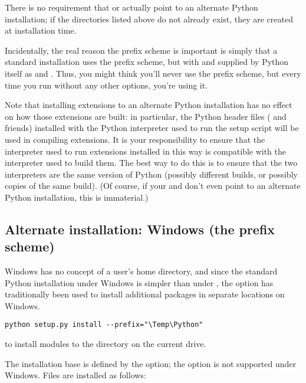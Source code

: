 \documentclass{howto}
\begin{document}
There is no requirement that  or
 actually point to an alternate Python
installation; if the directories listed above do not already exist, they
are created at installation time.

Incidentally, the real reason the prefix scheme is important is simply
that a standard \UNIX{} installation uses the prefix scheme, but with
 and  supplied by
Python itself as  and .  Thus,
you might think you'll never use the prefix scheme, but every time you
run  without any other options, you're
using it.

Note that installing extensions to an alternate Python installation has
no effect on how those extensions are built: in particular, the Python
header files ( and friends) installed with the Python
interpreter used to run the setup script will be used in compiling
extensions.  It is your responsibility to ensure that the interpreter
used to run extensions installed in this way is compatible with the
interpreter used to build them.  The best way to do this is to ensure
that the two interpreters are the same version of Python (possibly
different builds, or possibly copies of the same build).  (Of course, if
your  and  don't even
point to an alternate Python installation, this is immaterial.)


\subsection{Alternate installation: Windows (the prefix scheme)}
\label{alt-install-windows}

Windows has no concept of a user's home directory, and since the
standard Python installation under Windows is simpler than under
\UNIX, the  option has traditionally been used
to install additional packages in separate locations on Windows.

\begin{verbatim}
python setup.py install --prefix="\Temp\Python"
\end{verbatim}

to install modules to the
 directory on the
current drive.

The installation base is defined by the  option;
the  option is not supported under Windows.
Files are installed as follows:
\end{document}
